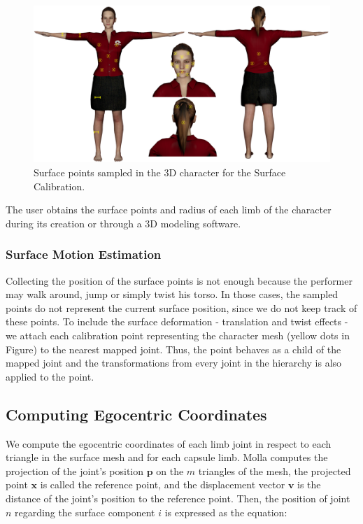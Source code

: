 \documentclass{vgtc}
\makeatletter
\def\maxwidth{\ifdim\Gin@nat@width>\linewidth\linewidth
    \else\Gin@nat@width\fi}
\let\Oldincludegraphics\includegraphics
\renewcommand{\includegraphics}[1]{\Oldincludegraphics[width=.8\maxwidth]{#1}}
\makeatother
\begin{document}
\begin{figure}
\centering
\includegraphics{../figures/TalitaPoints.png}
\caption{Surface points sampled in the 3D character for the Surface
Calibration.}
\end{figure}

The user obtains the surface points and radius of each limb of the
character during its creation or through a 3D modeling software.

    \subsubsection{Surface Motion
Estimation}\label{surface-motion-estimation}

Collecting the position of the surface points is not enough because the
performer may walk around, jump or simply twist his torso. In those
cases, the sampled points do not represent the current surface position,
since we do not keep track of these points. To include the surface
deformation - translation and twist effects - we attach each calibration
point representing the character mesh (yellow dots in Figure) to the
nearest mapped joint. Thus, the point behaves as a child of the mapped
joint and the transformations from every joint in the hierarchy is also
applied to the point.

    \subsection{Computing Egocentric
Coordinates}\label{computing-egocentric-coordinates}

We compute the egocentric coordinates of each limb joint in respect to
each triangle in the surface mesh and for each capsule limb. Molla
computes the projection of the joint's position \(\mathbf{p}\) on the
\(m\) triangles of the mesh, the projected point \(\mathbf{x}\) is
called the reference point, and the displacement vector \(\mathbf{v}\)
is the distance of the joint's position to the reference point. Then,
the position of joint \(n\) regarding the surface component \(i\) is
expressed as the equation:
\end{document}
